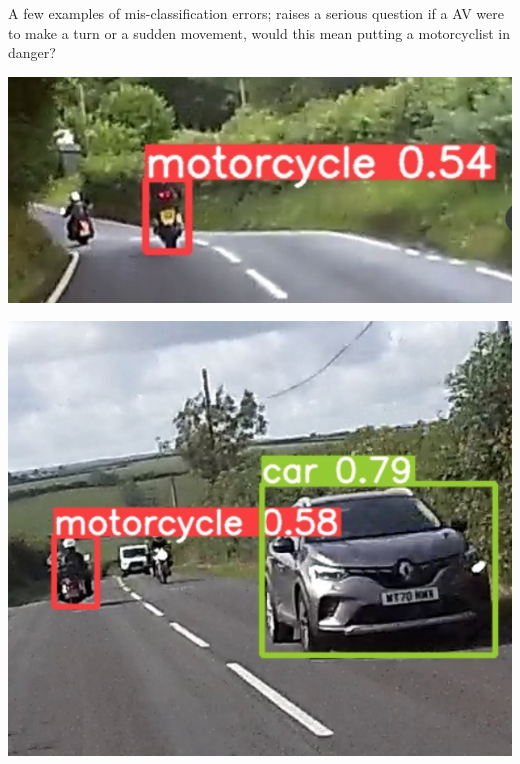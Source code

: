 \documentclass[a0,portrait]{a0poster}
\begin{document}
\begin{multicols}{2}
		A few examples of mis-classification errors; raises a serious question if a AV were to make a turn or a sudden movement, would this mean putting a motorcyclist in danger?
		\begin{center}\vspace{1cm}
			\begin{minipage}{0.15\textwidth}
				\centering
				\includegraphics[width=\linewidth]{fail.png}
				\label{fig:detectionOfOne}
			\end{minipage}\hfill
			\begin{minipage}{0.15\textwidth}
				\centering
				\includegraphics[width=\linewidth]{left_turn.png}
				\label{fig:lateClassificationP1}
			\end{minipage}\hfill
			\begin{minipage}{0.15\textwidth}

\end{minipage}
\end{center}
\end{multicols}
\end{document}
